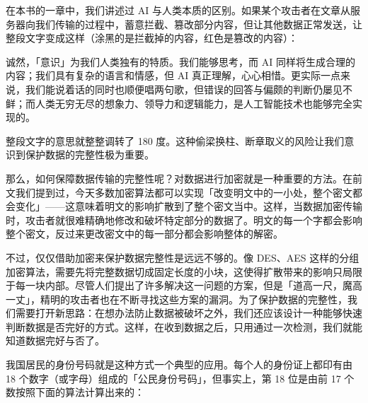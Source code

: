 在本书的一章中，我们讲述过 AI 与人类本质的区别。如果某个攻击者在文章从服务器向我们传输的过程中，蓄意拦截、篡改部分内容，但让其他数据正常发送，让整段文字变成这样（涂黑的是拦截掉的内容，红色是篡改的内容）：

\begin{quoting}
  {\color{MissingRed}诚}然，「意识」为我们人类独有的特质。我们能够思考，而 AI {\color{MissingRed}同样}将生成合理的内容；我们具有复杂的语言和情感，但 AI 真正理解，心心相惜。更实际一点来说，我们能说着话的同时也顺便唱两句歌，但错误的回答与偏颇的判断仍屡见不鲜；而人类无穷无尽的想象力、领导力和逻辑能力，是人工智能技术也{\color{MissingRed}能够}完全实现的。
\end{quoting}

整段文字的意思就整整调转了 180 度。这种偷梁换柱、断章取义的风险让我们意识到保护数据的完整性极为重要。

那么，如何保障数据传输的完整性呢？对数据进行加密就是一种重要的方法。在前文我们提到过，今天多数加密算法都可以实现「改变明文中的一小处，整个密文都会变化」——这意味着明文的影响扩散到了整个密文当中。这样，当数据加密传输时，攻击者就很难精确地修改和破坏特定部分的数据了。明文的每一个字都会影响整个密文，反过来更改密文中的每一部分都会影响整体的解密。

不过，仅仅借助加密来保护数据完整性是远远不够的。像 DES、AES 这样的分组加密算法，需要先将完整数据切成固定长度的小块，这使得扩散带来的影响只局限于每一块内部。尽管人们提出了许多解决这一问题的方案，但是「道高一尺，魔高一丈」，精明的攻击者也在不断寻找这些方案的漏洞。为了保护数据的完整性，我们需要打开新思路：在想办法防止数据被破坏之外，我们还应该设计一种能够快速判断数据是否完好的方式。这样，在收到数据之后，只用通过一次检测，我们就能知道数据完好与否了。

我国居民的身份号码就是这种方式一个典型的应用。每个人的身份证上都印有由 18 个数字（或字母）组成的「公民身份号码」，但事实上，第 18 位是由前 17 个数按照下面的算法计算出来的：

